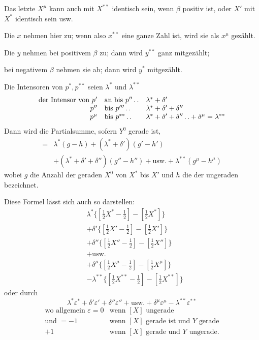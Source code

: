 Das letzte $X^\mu$ kann auch mit $X^{**}$ identisch sein, wenn $\beta$ positiv ist, oder $X'$ mit $X^*$ identisch sein usw.

Die $x$ nehmen hier zu; wenn also $x^{**}$ eine ganze Zahl ist, wird sie als $x^\mu$ gezählt.

Die $y$ nehmen bei positivem $\beta$ zu; dann wird $y^{**}$ ganz mitgezählt;
\begin{center}bei negativem $\beta$ nehmen sie ab; dann wird $y^*$ mitgezählt.\end{center}

Die Intensoren von $p^*,p^{**}$ seien $\lambda^*$ und $\lambda^{**}$
\[
\begin{array}{rll}
\text{der Intensor von }p'&\text{an bis }p''\mathinner{.\,.}&\lambda^*+\delta'\\
p''&\text{bis }p'''\mathinner{.\,.}&\lambda^*+\delta'+\delta''\\
p^\mu&\text{bis }p^{**}\mathinner{.\,.}&\lambda^*+\delta'+\delta''\mathinner{.\,.}+\delta^\mu=\lambda^{**}
\end{array}
\]
Dann wird die Partialsumme, sofern $Y^0$ gerade ist,
\[
\begin{aligned}
={}&\lambda^*(g-h)+(\lambda^*+\delta')(g'-h')\\
&+(\lambda^*+\delta'+\delta'')(g''-h'')+\text{usw.}+\lambda^{**}(g^\mu-h^\mu)
\end{aligned}
\]
wobei $g$ die Anzahl der geraden $X^0$ von $X^*$ bis $X'$ und $h$ die der ungeraden bezeichnet.

\clearpage{}
Diese Formel lässt sich auch so darstellen:
\[
\begin{aligned}
&\lambda^*\{[\tfrac12X^*-\tfrac12]-[\tfrac12X^*]\}\\
&+\delta'\{[\tfrac12X'-\tfrac12]-[\tfrac12X']\}\\
&+\delta''\{[\tfrac12X''-\tfrac12]-[\tfrac12X'']\}\\
&+\text{usw.}\\
&+\delta^\mu\{[\tfrac12X^\mu-\tfrac12]-[\tfrac12X^\mu]\}\\
&-\lambda^{**}\{[\tfrac12X^{**}-\tfrac12]-[\tfrac12X^{**}]\}
\end{aligned}
\]
oder durch
\[
\lambda^*\varepsilon^*+\delta'\varepsilon'+\delta''\varepsilon''+\text{usw.}+\delta^\mu\varepsilon^\mu-\lambda^{**}\varepsilon^{**}
\]
\[
\begin{array}{rll}
\text{wo allgemein }\varepsilon=0&\text{wenn }[X]\text{ ungerade}\\
\text{und }=-1&\text{wenn }[X]\text{ gerade ist und }Y\text{ gerade}\\
+1&\text{wenn }[X]\text{ gerade und }Y\text{ ungerade.}
\end{array}
\]

